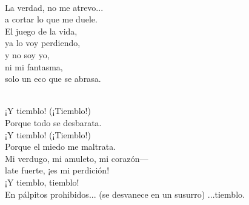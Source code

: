 \begin{lyrics}
 \\
La verdad, no me atrevo...\\
a cortar lo que me duele.\\
El juego de la vida,\\
ya lo voy perdiendo,\\
y no soy yo,\\
ni mi fantasma,\\
solo un eco que se abrasa.

 \\
¡Y tiemblo! (¡Tiemblo!)\\
Porque todo se desbarata.\\
¡Y tiemblo! (¡Tiemblo!)\\
Porque el miedo me maltrata.\\
Mi verdugo, mi amuleto, mi corazón—\\
late fuerte, ¡es mi perdición!\\
¡Y tiemblo, tiemblo!\\
En pálpitos prohibidos...
(se desvanece en un susurro)
...tiemblo.
\end{lyrics}


